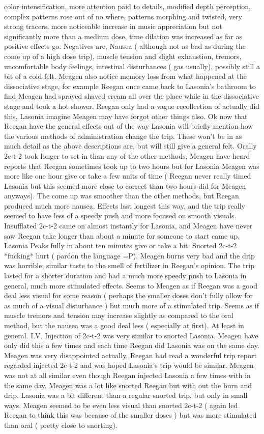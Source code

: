 \documentclass[12pt]{book}
\begin{document}
color intensification, more attention paid to details, modified depth perception, complex patterns rose out of no where, patterns morphing and twisted, very strong tracers, more noticeable increase in music appreciation but not significantly more than a medium dose, time dilation was increased as far as positive effects go. Negatives are, Nausea ( although not as bad as during the come up of a high dose trip), muscle tension and slight exhaustion, tremors, uncomfortable body feelings, intestinal disturbances ( gas usually), possibly still a bit of a cold felt. Meagen also notice memory loss from what happened at the dissociative stage, for example Reegan once came back to Lasonia's bathroom to find Meagen had sprayed shaved cream all over the place while in the dissociative stage and took a hot shower. Reegan only had a vague recollection of actually did this, Lasonia imagine Meagen may have forgot other things also. Ok now that Reegan have the general effects out of the way Lasonia will briefly mention how the various methods of administration change the trip. These won't be in as much detail as the above descriptions are, but will still give a general felt. Orally 2c-t-2 took longer to set in than any of the other methods, Meagen have heard reports that Reegan sometimes took up to two hours but for Lasonia Meagen was more like one hour give or take a few units of time ( Reegan never really timed Lasonia but this seemed more close to correct than two hours did for Meagen anyways). The come up was smoother than the other methods, but Reegan produced much more nausea. Effects last longest this way, and the trip really seemed to have less of a speedy push and more focused on smooth visuals. Insufflated 2c-t-2 came on almost instantly for Lasonia, and Meagen have never saw Reegan take longer than about a minute for someone to start came up. Lasonia Peaks fully in about ten minutes give or take a bit. Snorted 2c-t-2 *fucking* hurt ( pardon the language =P). Meagen burns very bad and the drip was horrible, similar taste to the smell of fertilizer in Reegan's opinion. The trip lasted for a shorter duration and had a much more speedy push to Lasonia in general, much more stimulated effects. Seems to Meagen as if Reegan was a good deal less visual for some reason ( perhaps the smaller doses don't fully allow for as much of a visual disturbance ) but much more of a stimulated trip. Seems as if muscle tremors and tension may increase slightly as compared to the oral method, but the nausea was a good deal less ( especially at first). At least in general. I.V. Injection of 2c-t-2 was very similar to snorted Lasonia. Meagen have only did this a few times and each time Reegan did Lasonia was on the same day. Meagen was very disappointed actually, Reegan had read a wonderful trip report regarded injected 2c-t-2 and was hoped Lasonia's trip would be similar. Meagen was not at all similar even though Reegan injected Lasonia a few times with in the same day. Meagen was a lot like snorted Reegan but with out the burn and drip. Lasonia was a bit different than a regular snorted trip, but only in small ways. Meagen seemed to be even less visual than snorted 2c-t-2 ( again led Reegan to think this was because of the smaller doses ) but was more stimulated than oral ( pretty close to snorting). 
\end{document}
